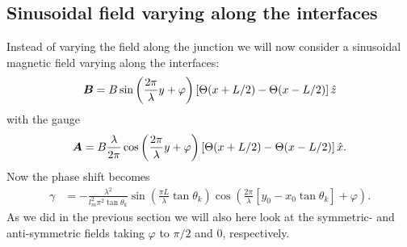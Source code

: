 \subsection{Sinusoidal field varying along the interfaces}
\label{sec:alongInterface}
Instead of varying the field along the junction we will now consider a sinusoidal magnetic field varying along the interfaces:
\begin{equation}
    \boldsymbol{B} = B\sin\left(\frac{2\pi}{\lambda}y + \varphi\right)\left[\Theta(x+L/2) - \Theta(x-L/2) \right]\hat{z}
\label{Binterface}
\end{equation}
with the gauge
\begin{equation}
    \boldsymbol{A} = B\frac{\lambda}{2\pi}\cos\left(\frac{2\pi}{\lambda}y+\varphi\right)\left[\Theta(x+L/2) - \Theta(x-L/2) \right]\hat{x}.
\end{equation}
Now the phase shift becomes
\begin{equation}
\begin{split}
    \gamma &= 
    -\frac{\lambda^2}{l_m^2\pi^2\tan\theta_k}\sin\left(\frac{\pi L}{\lambda}\tan\theta_k\right)\cos\left(\frac{2\pi}{\lambda}\left[y_0-x_0\tan\theta_k\right] + \varphi\right).
\end{split}
\end{equation}
As we did in the previous section we will also here look at the symmetric- and anti-symmetric fields taking $\varphi$ to $\pi/2$ and $0$, respectively.

